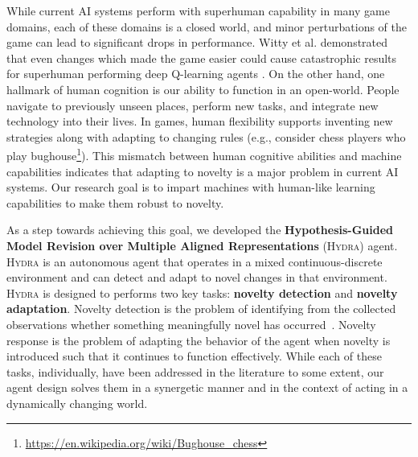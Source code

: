 \documentclass[sigconf]{aamas}
\newcommand{\hydra}{\textsc{Hydra}\xspace} %
\begin{document}
While current AI systems perform with superhuman capability in many game domains, each of these domains is a closed world, and minor perturbations of the game can lead to significant drops in performance. 
Witty et al. demonstrated that even changes which made the game easier could cause catastrophic results for superhuman performing deep Q-learning agents \cite{witty2018measuring}. 
On the other hand, one hallmark of human cognition is our ability to function in an open-world. 
People navigate to previously unseen places, perform new tasks, and integrate new technology into their lives. In games, human flexibility supports inventing new strategies along with adapting to changing rules (e.g., consider chess players who play bughouse\footnote{\url{https://en.wikipedia.org/wiki/Bughouse_chess}}).
This mismatch between human cognitive abilities and machine capabilities indicates that adapting to novelty is a major problem in current AI systems. Our research goal is to impart machines with human-like learning capabilities to make them robust to novelty. 


As a step towards achieving this goal, we developed the \textbf{Hypothesis-Guided Model Revision over Multiple Aligned Representations} (\hydra) agent. 
\hydra is an autonomous agent that operates in a mixed continuous-discrete environment and can detect and adapt to novel changes in that environment. 
\hydra is designed to performs two key tasks: \textbf{novelty detection} and \textbf{novelty adaptation}.
Novelty detection is the problem of identifying from the collected observations whether something meaningfully novel has occurred~\cite{pimentel2014review}. 
Novelty response is the problem of adapting the behavior of the agent when novelty is introduced such that it continues to function effectively. 
While each of these tasks, individually, have been addressed in the literature to some extent, 
our agent design solves them in a synergetic manner and in the context of acting in a dynamically changing world. 

% 
\end{document}
